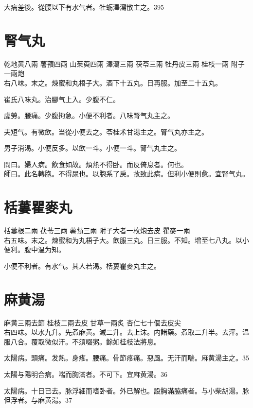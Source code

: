 大病差後。從腰以下有水气者。牡蛎澤瀉散主之。395

\section{腎气丸}

乾地黄{\scriptsize 八兩} 薯蕷{\scriptsize 四兩} 山茱萸{\scriptsize 四兩} 澤瀉{\scriptsize 三兩} 茯苓{\scriptsize 三兩} 牡丹皮{\scriptsize 三兩} 桂枝{\scriptsize 一兩} 附子{\scriptsize 一兩炮}\\
右八味。末之。煉蜜和丸梧子大。酒下十五丸。日再服。{\khaaitp 加至二十五丸。}

崔氏八味丸。治腳气上入。少腹不仁。

虗勞。腰痛。少腹拘急。小便不利者。八味腎气丸主之。

夫短气。有微飲。当從小便去之。苓桂术甘湯主之。腎气丸亦主之。

男子消渴。小便反多。以飲一斗。小便一斗。腎气丸主之。

問曰。婦人病。飲食如故。煩熱不得卧。而反倚息者。何也。\\
師曰。此名轉胞。不得尿也。以胞系了戾。故致此病。但利小便則愈。宜腎气丸。

\section{栝蔞瞿麥丸}

栝蔞根{\scriptsize 二兩} 茯苓{\scriptsize 三兩} 薯蕷{\scriptsize 三兩} 附子{\scriptsize 大者一枚炮去皮} 瞿麥{\scriptsize 一兩}\\
右五味。末之。煉蜜和为丸梧子大。飲服三丸。日三服。不知。增至七八丸。以小便利。腹中温为知。

小便不利者。有水气。其人若渴。栝蔞瞿麥丸主之。

\section{麻黄湯}

麻黄{\scriptsize 三兩去節} 桂枝{\scriptsize 二兩去皮} 甘草{\scriptsize 一兩炙} 杏仁{\scriptsize 七十個去皮尖}\\
右四味。以水九升。先煮麻黄。減二升。去上沫。内諸藥。煮取二升半。去滓。温服八合。覆取微似汗。不須啜粥。餘如桂枝法將息。

太陽病。頭痛。发熱。身疼。腰痛。骨節疼痛。惡風。无汗而喘。麻黄湯主之。35

太陽与陽明合病。喘而胸滿者。不可下。宜麻黄湯。36

太陽病。十日已去。脉浮細而嗜卧者。外已解也。設胸滿脇痛者。与小柴胡湯。脉{\khaaitp 但}浮者。与麻黄湯。37

